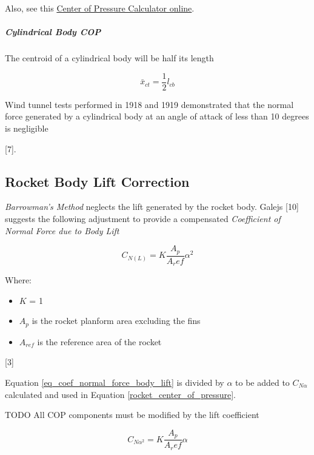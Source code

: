 \documentclass[]{article}
\providecommand{\tightlist}{%
  \setlength{\itemsep}{0pt}\setlength{\parskip}{0pt}}
\let\oldsubparagraph\subparagraph
\renewcommand{\subparagraph}[1]{\oldsubparagraph{#1}\mbox{}}
\begin{document}
Also, see this
\href{http://physics.gallaudet.edu/tools/rocketcop.html}{Center of
Pressure Calculator online}.

\subparagraph{Cylindrical Body COP}\label{cylindrical-body-cop}

The centroid of a cylindrical body will be half its length

\begin{equation}
\label{eq_centroid_bodytube}
\bar{x}_{ct} = \dfrac{1}{2} l_{cb}
\end{equation}

Wind tunnel tests performed in 1918 and 1919 demonstrated that the
normal force generated by a cylindrical body at an angle of attack of
less than 10 degrees is negligible

{[}7{]}.

\subsection{Rocket Body Lift
Correction}\label{rocket-body-lift-correction}

\emph{Barrowman's Method} neglects the lift generated by the rocket
body. Galejs {[}10{]} suggests the following adjustment to provide a
compensated \emph{Coefficient of Normal Force due to Body Lift}

\begin{equation}
\label{eq_coef_normal_force_body_lift}
C_{N(L)} = K \dfrac{A_p}{A_ref} \alpha^2
\end{equation}

Where:

\begin{itemize}
\tightlist
\item
  \(K\) = 1
\item
  \(A_p\) is the rocket planform area excluding the fins
\item
  \(A_{ref}\) is the reference area of the rocket
\end{itemize}

{[}3{]}

Equation \ref{eq_coef_normal_force_body_lift} is divided by \(\alpha\)
to be added to \(C_{N \alpha}\) calculated and used in Equation
\ref{rocket_center_of_pressure}.

TODO All COP components must be modified by the lift coefficient

\begin{equation}
\label{eq_coef_normal_force_body_lift_alpha}
C_{N \alpha^2} = K \dfrac{A_p}{A_ref} \alpha
\end{equation}
\end{document}
